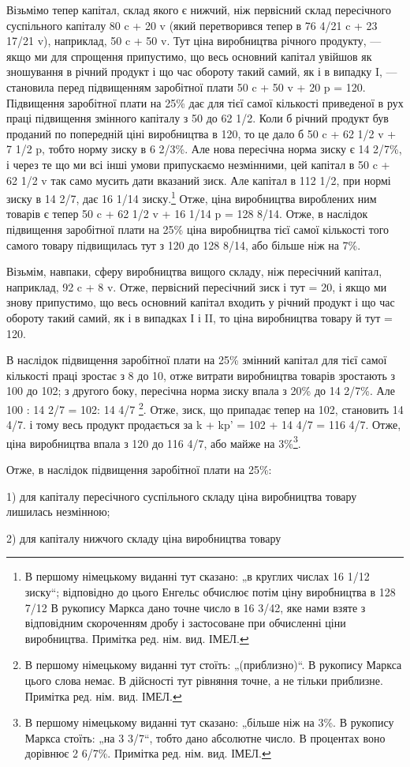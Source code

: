 Візьмімо тепер капітал, склад якого є нижчий, ніж первісний
склад пересічного суспільного капіталу 80 c + 20 v (який
перетворився тепер в 76 4/21 c + 23 17/21 v), наприклад, 50 c + 50 v.
Тут ціна виробництва річного продукту, — якщо ми для спрощення
припустимо, що весь основний капітал увійшов як зношування
в річний продукт і що час обороту такий самий, як
і в випадку I, — становила перед підвищенням заробітної плати
50 c + 50 v + 20 p = 120. Підвищення заробітної плати на 25\%
дає для тієї самої кількості приведеної в рух праці підвищення
змінного капіталу з 50 до 62 1/2. Коли б річний продукт був
проданий по попередній ціні виробництва в 120, то це дало б
50 c + 62 1/2 v + 7 1/2 p, тобто норму зиску в 6 2/3\%. Але нова пересічна
норма зиску є 14 2/7\%, і через те що ми всі інші умови
припускаємо незмінними, цей капітал в 50 c + 62 1/2 v так само
мусить дати вказаний зиск. Але капітал в 112 1/2, при нормі зиску
в 14 2/7, дає 16 1/14 зиску.\footnote*{
В першому німецькому виданні тут сказано: „в круглих числах 16 1/12
зиску“; відповідно до цього Енгельс обчислює потім ціну виробництва в 128 7/12
В рукопису Маркса дано точне число в 16 3/42, яке нами взяте з відповідним
скороченням дробу і застосоване при обчисленні ціни виробництва. Примітка
ред. нім. вид. ІМЕЛ.
} Отже, ціна виробництва вироблених
ним товарів є тепер 50 c + 62 1/2 v + 16 1/14 p = 128 8/14. Отже, в наслідок
підвищення заробітної плати на 25\% ціна виробництва
тієї самої кількості того самого товару підвищилась тут з 120
до 128 8/14, або більше ніж на 7\%.

Візьмім, навпаки, сферу виробництва вищого складу, ніж пересічний
капітал, наприклад, 92 c + 8 v. Отже, первісний пересічний
зиск і тут = 20, і якщо ми знову припустимо, що весь
основний капітал входить у річний продукт і що час обороту
такий самий, як і в випадках І і II, то ціна виробництва товару
й тут = 120.

В наслідок підвищення заробітної плати на 25\% змінний капітал
для тієї самої кількості праці зростає з 8 до 10, отже
витрати виробництва товарів зростають з 100 до 102; з другого
боку, пересічна норма зиску впала з 20\% до 14 2/7\%. Але
100 : 14 2/7 = 102: 14 4/7 \footnote*{
В першому німецькому виданні тут стоїть: „(приблизно)“. В рукопису
Маркса цього слова немає. В дійсності тут рівняння точне, а не тільки приблизне.
Примітка ред. нім. вид. ІМЕЛ.
}. Отже, зиск, що припадає тепер на 102,
становить 14 4/7. і тому весь продукт продається за k + kp' =
102 + 14 4/7 = 116 4/7. Отже, ціна виробництва впала з 120 до
116 4/7, або майже на 3\%\footnote*{
В першому німецькому виданні тут сказано: „більше ніж на 3\%. В рукопису
Маркса стоїть: „на 3 3/7“, тобто дано абсолютне число. В процентах воно
дорівнює 2 6/7\%. Примітка ред. нім. вид. ІМЕЛ.
}.

Отже, в наслідок підвищення заробітної плати на 25\%:

1) для капіталу пересічного суспільного складу ціна виробництва
товару лишилась незмінною;

2) для капіталу нижчого складу ціна виробництва товару